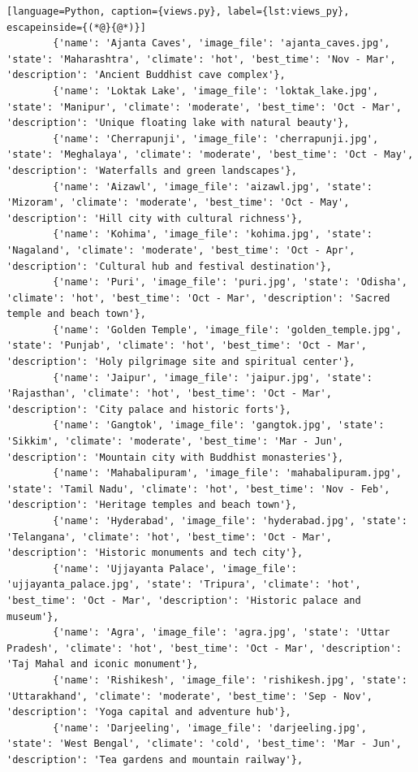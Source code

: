 \begin{lstlisting}[language=Python, caption={views.py}, label={lst:views_py}, escapeinside={(*@}{@*)}]
        {'name': 'Ajanta Caves', 'image_file': 'ajanta_caves.jpg', 'state': 'Maharashtra', 'climate': 'hot', 'best_time': 'Nov - Mar', 'description': 'Ancient Buddhist cave complex'},
        {'name': 'Loktak Lake', 'image_file': 'loktak_lake.jpg', 'state': 'Manipur', 'climate': 'moderate', 'best_time': 'Oct - Mar', 'description': 'Unique floating lake with natural beauty'},
        {'name': 'Cherrapunji', 'image_file': 'cherrapunji.jpg', 'state': 'Meghalaya', 'climate': 'moderate', 'best_time': 'Oct - May', 'description': 'Waterfalls and green landscapes'},
        {'name': 'Aizawl', 'image_file': 'aizawl.jpg', 'state': 'Mizoram', 'climate': 'moderate', 'best_time': 'Oct - May', 'description': 'Hill city with cultural richness'},
        {'name': 'Kohima', 'image_file': 'kohima.jpg', 'state': 'Nagaland', 'climate': 'moderate', 'best_time': 'Oct - Apr', 'description': 'Cultural hub and festival destination'},
        {'name': 'Puri', 'image_file': 'puri.jpg', 'state': 'Odisha', 'climate': 'hot', 'best_time': 'Oct - Mar', 'description': 'Sacred temple and beach town'},
        {'name': 'Golden Temple', 'image_file': 'golden_temple.jpg', 'state': 'Punjab', 'climate': 'hot', 'best_time': 'Oct - Mar', 'description': 'Holy pilgrimage site and spiritual center'},
        {'name': 'Jaipur', 'image_file': 'jaipur.jpg', 'state': 'Rajasthan', 'climate': 'hot', 'best_time': 'Oct - Mar', 'description': 'City palace and historic forts'},
        {'name': 'Gangtok', 'image_file': 'gangtok.jpg', 'state': 'Sikkim', 'climate': 'moderate', 'best_time': 'Mar - Jun', 'description': 'Mountain city with Buddhist monasteries'},
        {'name': 'Mahabalipuram', 'image_file': 'mahabalipuram.jpg', 'state': 'Tamil Nadu', 'climate': 'hot', 'best_time': 'Nov - Feb', 'description': 'Heritage temples and beach town'},
        {'name': 'Hyderabad', 'image_file': 'hyderabad.jpg', 'state': 'Telangana', 'climate': 'hot', 'best_time': 'Oct - Mar', 'description': 'Historic monuments and tech city'},
        {'name': 'Ujjayanta Palace', 'image_file': 'ujjayanta_palace.jpg', 'state': 'Tripura', 'climate': 'hot', 'best_time': 'Oct - Mar', 'description': 'Historic palace and museum'},
        {'name': 'Agra', 'image_file': 'agra.jpg', 'state': 'Uttar Pradesh', 'climate': 'hot', 'best_time': 'Oct - Mar', 'description': 'Taj Mahal and iconic monument'},
        {'name': 'Rishikesh', 'image_file': 'rishikesh.jpg', 'state': 'Uttarakhand', 'climate': 'moderate', 'best_time': 'Sep - Nov', 'description': 'Yoga capital and adventure hub'},
        {'name': 'Darjeeling', 'image_file': 'darjeeling.jpg', 'state': 'West Bengal', 'climate': 'cold', 'best_time': 'Mar - Jun', 'description': 'Tea gardens and mountain railway'},

\end{lstlisting}
